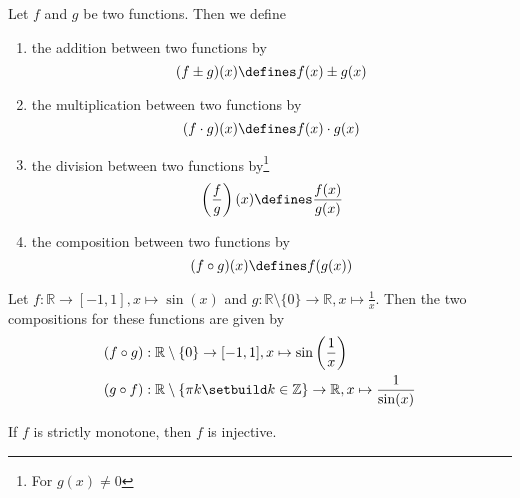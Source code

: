 \begin{definition}\label{def-function-operations}
	Let $f$ and $g$ be two functions. Then we define
	\begin{enumerate}
		\item the addition between two functions by
		      \begin{equation}
			      (f \pm g)(x) \defines f(x) \pm g(x)
		      \end{equation}
		\item the multiplication between two functions by
		      \begin{equation}
			      (f \cdot g)(x) \defines f(x) \cdot g(x)
		      \end{equation}
		\item the division between two functions by\footnote{For $g(x)\neq0$}
		      \begin{equation}
			      \left(\frac{f}{g}\right)(x) \defines \frac{f(x)}{g(x)}
		      \end{equation}
		\item the composition between two functions by
		      \begin{equation}
			      (f \circ g)(x) \defines f(g(x))
		      \end{equation}
	\end{enumerate}
\end{definition}

\begin{exm}
	Let $f:\mathbb{R}\to[-1,1],x\mapsto\sin(x)$ and $g:\mathbb{R}\setminus\{0\}\to\mathbb{R},x\mapsto\tfrac{1}{x}$.
	Then the two compositions for these functions are given by
	\begin{align*}
		 & (f \circ g):\mathbb{R}\setminus\{0\}\to[-1,1],x\mapsto\sin\left(\frac{1}{x}\right)                                 \\
		 & (g \circ f):\mathbb{R}\setminus\left\{\pi k\setbuild k\in\mathbb{Z}\right\}\to\mathbb{R},x\mapsto\frac{1}{\sin(x)}
	\end{align*}
\end{exm}

\begin{rem}\label{rem-monotone-implies-injective}
	If $f$ is strictly monotone, then $f$ is injective.
\end{rem}

